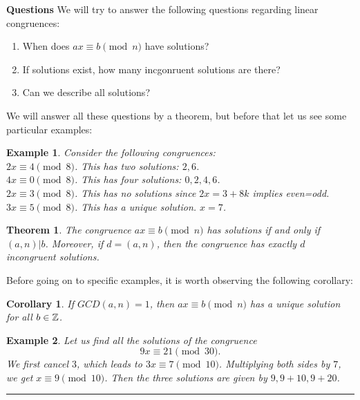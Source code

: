 \documentclass[12pt]{article}
\theoremstyle{plain}
\newtheorem{corollary}{Corollary}
\newtheorem{example}{Example}
\newtheorem{theorem}{Theorem}
\theoremstyle{definition}
\theoremstyle{remark}
\begin{document}
\bigskip
\noindent
{\bf Questions} We will try to answer the following questions regarding linear congruences:
\begin{enumerate}
    \item When does $ax\equiv b \pmod{n}$ have solutions?
    \item If solutions exist, how many incgonruent solutions are there?
    \item Can we describe all solutions?
\end{enumerate}

\bigskip
\noindent
We will answer all these questions by a theorem, but before that let us see some particular examples:
\begin{example}
Consider the following congruences: \\
$2x\equiv 4 \pmod{8}$. This has two solutions: $2, 6$. \\
$4x\equiv 0 \pmod{8}$. This has four solutions: $0,2,4,6$. \\
$2x\equiv 3 \pmod{8}$. This has no solutions since $2x=3+8k$ implies even=odd. \\
$3x\equiv 5 \pmod{8}$. This has a unique solution. $x=7$.
\end{example}

\bigskip
\begin{theorem}
The congruence $ax\equiv b \pmod{n}$ has solutions if and only if $(a,n)|b$. Moreover, if $d=(a,n)$, then the congruence has exactly $d$ incongruent solutions.
\end{theorem}

\bigskip
\noindent
Before going on to specific examples, it is worth observing the following corollary:
\begin{corollary}
If $GCD(a,n)=1$, then $ax\equiv b \pmod{n}$ has a unique solution for all $b \in \mathbb{Z}$.
\end{corollary}

\bigskip
\begin{example}
Let us find all the solutions of the congruence
$$9x\equiv 21 \pmod{30}.$$
We first cancel $3$, which leads to $3x\equiv 7 \pmod{10}$. Multiplying both sides by $7$, we get $x\equiv 9 \pmod{10}$. Then the three solutions are given by $9, 9+10, 9+20$.
\end{example}

\bigskip
\hrule
\end{document}
